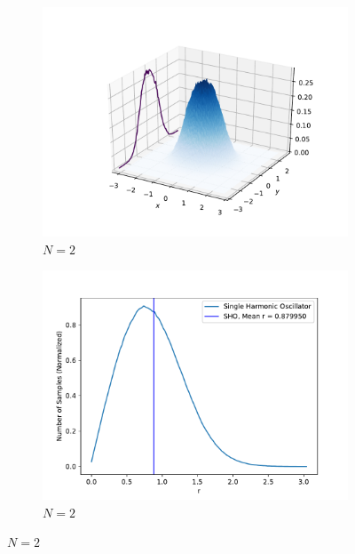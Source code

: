 \documentclass[../main.tex]{subfiles}
\begin{document}
\begin{figure}
\centering
\begin{subfigure}{0.48\textwidth}
\includegraphics[width=\linewidth]{figures/densitySHO/density3D_SHO_N2_Omega1_2d}
\caption{$N=2$} \label{fig:SHO_density3D_N2_a}
\end{subfigure}\hspace*{\fill}
\begin{subfigure}{0.48\textwidth}
\includegraphics[width=\linewidth]{figures/densitySHO/density_SHO_N2_Omega1_2d}
\caption{$N=2$} \label{fig:SHO_density_N2_b}
\end{subfigure}


\end{figure}
\end{document}
